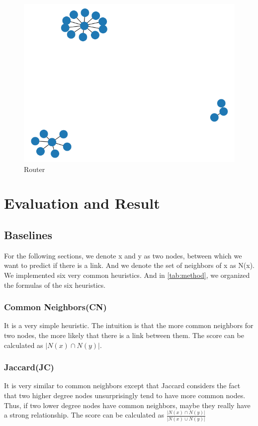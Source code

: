 \documentclass[12pt]{article}
\begin{document}
\begin{figure}[h]
	\centering
	\includegraphics[scale=0.3]{Router}
	\caption{Router}
	\label{fig:Router}
\end{figure}
\section{Evaluation and Result}

\subsection{Baselines}
For the following sections, we denote x and y as two nodes, between which we want to predict if there is a link. And we denote the set of neighbors of x as N(x). We implemented six very common heuristics. And in \ref{tab:method}, we organized the formulas of the six heuristics. \\
\subsubsection{Common Neighbors(CN)}
It is a very simple heuristic. The intuition is that the more common neighbors for two nodes, the more likely that there is a link between them. The score can be calculated as $|N(x) \cap N(y)|$.
\subsubsection{Jaccard(JC)}
It is very similar to common neighbors except that Jaccard considers the fact that two higher degree nodes unsurprisingly tend to have more common nodes. Thus, if two lower degree nodes have common neighbors, maybe they really have a strong relationship. The score can be calculated as $\frac{|N(x) \cap N(y)|}{|N(x) \cup N(y)|}$
\end{document}

